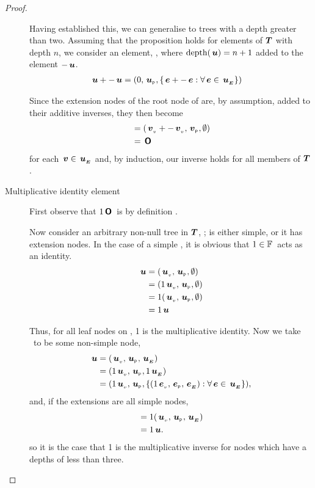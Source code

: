 \begin{proposition}
\begin{proof}
\begin{description}
      Having established this, we can generalise to trees with a depth
      greater than two. Assuming that the proposition holds for
      elements of $\boldsymbol{T}$ with depth \(n\), we consider an element, ,
      where \(\operatorname{depth}(\,\boldsymbol{u}) = n+1\) added to the element
      \(-\,\boldsymbol{u}\).
      \begin{align*}
          \,\boldsymbol{u} + -\,\boldsymbol{u} &= (0, {\,\boldsymbol{u}}_{{}_{\mathsf{P}}}, \lbrace \,\boldsymbol{e} + -\,\boldsymbol{e}: \forall \,\boldsymbol{e} \in {\,\boldsymbol{u}}_{{}_{\boldsymbol{E}}}\rbrace)
      \end{align*}

      Since the extension nodes of the root node of  are, by
      assumption, added to their additive inverses, they then become
      \begin{align*}
          &= ({\,\boldsymbol{v}}_{{}_{v}} + -{\,\boldsymbol{v}}_{{}_{v}}, {\,\boldsymbol{v}}_{{}_{\mathsf{P}}}, \emptyset) \\
          &= \,\boldsymbol{\mathsf{O}}
      \end{align*}
      for each \(\,\boldsymbol{v}\in{\,\boldsymbol{u}}_{{}_{\boldsymbol{E}}}\) and, by induction, our inverse
      holds for all members of $\boldsymbol{T}$.


    \item[Multiplicative identity element]

      First observe that \(1\/\,\boldsymbol{\mathsf{O}}\)\ is by definition \tzerotree.

      Now consider an arbitrary  non-null tree in $\boldsymbol{T}$, ;
       is either simple, or it has extension nodes. In the
      case of a simple , it is obvious that \(1 \in
      \mathbb{F}\)\ acts as an identity.
      \begin{align*}
          \,\boldsymbol{u} &= ({\,\boldsymbol{u}}_{{}_{v}}, {\,\boldsymbol{u}}_{{}_{\mathsf{P}}}, \emptyset) \\
          &=  (1 {\,\boldsymbol{u}}_{{}_{v}}, {\,\boldsymbol{u}}_{{}_{\mathsf{P}}}, \emptyset) \\
          &=  1 ( {\,\boldsymbol{u}}_{{}_{v}}, {\,\boldsymbol{u}}_{{}_{\mathsf{P}}},\emptyset) \\
          &= 1 \,\boldsymbol{u}
      \end{align*}

      Thus, for all leaf nodes on , 1 is the multiplicative
      identity. Now we take \ to be some non-simple node, 
      \begin{align*}
          \,\boldsymbol{u} &= ({\,\boldsymbol{u}}_{{}_{v}}, {\,\boldsymbol{u}}_{{}_{\mathsf{P}}},{\,\boldsymbol{u}}_{{}_{\boldsymbol{E}}}) \\
          &=  (1 {\,\boldsymbol{u}}_{{}_{v}}, {\,\boldsymbol{u}}_{{}_{\mathsf{P}}}, 1 {\,\boldsymbol{u}}_{{}_{\boldsymbol{E}}}) \\
          &=  (1 {\,\boldsymbol{u}}_{{}_{v}}, {\,\boldsymbol{u}}_{{}_{\mathsf{P}}}, \lbrace (1 {\,\boldsymbol{e}}_{{}_{v}}, {\,\boldsymbol{e}}_{{}_{\mathsf{P}}}, {\,\boldsymbol{e}}_{{}_{\boldsymbol{E}}}): \forall \,\boldsymbol{e} \in {\,\boldsymbol{u}}_{{}_{\boldsymbol{E}}} \rbrace),
      \end{align*}
      and, if the extensions are all simple nodes,
      \begin{align*}
          &=  1 ({\,\boldsymbol{u}}_{{}_{v}}, {\,\boldsymbol{u}}_{{}_{\mathsf{P}}}, {\,\boldsymbol{u}}_{{}_{\boldsymbol{E}}}) \\
          &= 1 \,\boldsymbol{u}.
      \end{align*}
      so it is the case that 1 is the multiplicative inverse for nodes which
      have a depths of less than three. 
      

\end{description}
\end{proof}
\end{proposition}
